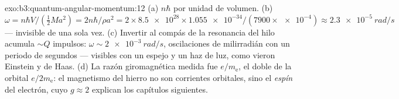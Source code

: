 \begin{solution}{exo:b3:quantum-angular-momentum:12}
(a) $n\hbar$ por unidad de volumen. (b) $\omega = n\hbar V/(\tfrac12 Ma^2)
= 2n\hbar/\rho a^2 = 2 \times \num{8.5e28} \times \num{1.055e-34}/
(7900 \times \num{e-4}) \approx \qty{2.3e-5}{rad/s}$ --- invisible
de una sola vez. (c) Invertir al compás de la resonancia del hilo
acumula $\sim Q$ impulsos: $\omega \sim \qty{2e-3}{rad/s}$,
oscilaciones de milirradián con un periodo de segundos --- visibles con un
espejo y un haz de luz, como vieron Einstein y de Haas. (d) La razón
giromagnética medida fue $e/m_{\text{e}}$, el doble de la orbital
$e/2m_{\text{e}}$: el magnetismo del hierro no son corrientes orbitales,
sino el \emph{espín} del electrón, cuyo $g \approx 2$ explican los capítulos
siguientes.
\end{solution}

